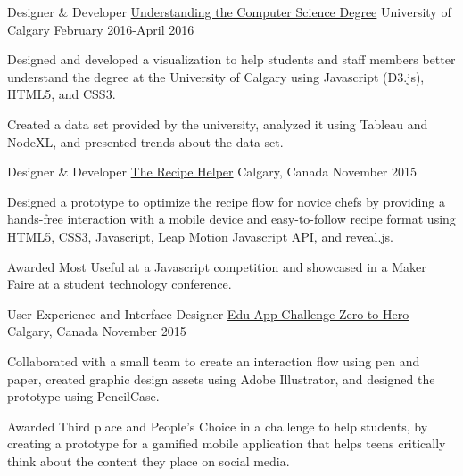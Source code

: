 \begin{cventries}
\cventry
    {Designer \& Developer}
    {\href{http://misscarriemah.github.io/CPSC-Degree/}{Understanding the Computer Science Degree}}
    {University of Calgary}
    {February 2016-April 2016}
    {
      \begin{cvitems}
        \item {Designed and developed a visualization to help students and staff members better understand the degree at the University of Calgary using Javascript (D3.js), HTML5, and CSS3.}
        \item {Created a data set provided by the university, analyzed it using Tableau and NodeXL, and presented trends about the data set.}
      \end{cvitems}
    }
    
    
  \cventry
    {Designer \& Developer}
    {\href{http://www.misscarriemah.ca/work/the-recipe-helper/}{The Recipe Helper}}
    {Calgary, Canada}
    {November 2015}
    {
      \begin{cvitems}
      	\item{Designed a prototype to optimize the recipe flow for novice chefs by providing a hands-free interaction with a mobile device and easy-to-follow recipe format using HTML5, CSS3, Javascript, Leap Motion Javascript API, and reveal.js.}
        \item {Awarded Most Useful at a Javascript competition and showcased in a Maker Faire at a student technology conference.}
      \end{cvitems}
    }
 \cventry
    {User Experience and Interface Designer}
    {\href{http://www.misscarriemah.ca/work/zero-to-hero/}{Edu App Challenge Zero to Hero}}
    {Calgary, Canada}
    {November 2015}
    {
      \begin{cvitems}
      	\item {Collaborated with a small team to create an interaction flow using pen and paper, created graphic design assets using Adobe Illustrator, and designed the prototype using PencilCase.}
        \item {Awarded Third place and People's Choice in a challenge to help students, by creating a prototype for a gamified mobile application that helps teens critically think about the content they place on social media.}
      \end{cvitems}
    }
    

\end{cventries}

